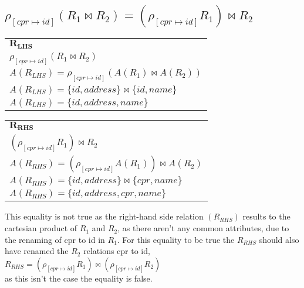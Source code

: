 \subsection{\normalsize{$\rho_{[cpr\mapsto id]}(R_1 \Join R_2) = (\rho_{[cpr\mapsto id]} R_1) \Join R_2$}}

\begin{table}[ht]
	\begin{tabular}{l}
		$\bm{R_{LHS}}$  \\
		$\rho_{[cpr\mapsto id]}(R_1 \Join R_2)$  \\
		$A(R_{LHS}) = \rho_{[cpr\mapsto id]}(A(R_1) \Join A(R_2))$  \\
		$A(R_{LHS}) = \{id, address\} \Join \{id, name\}$  \\
		$A(R_{LHS}) = \{id, address, name\}$
	\end{tabular}
\end{table}

\begin{table}[ht]
	\begin{tabular}{l}
		$\bm{R_{RHS}}$ \\
	 	$(\rho_{[cpr\mapsto id]} R_1) \Join R_2$ \\
		$A(R_{RHS}) = (\rho_{[cpr\mapsto id]}A(R_1)) \Join A(R_2)$ \\
		$A(R_{RHS}) = \{id, address\} \Join \{cpr, name\}$ \\
		$A(R_{RHS}) = \{id, address, cpr, name\}$
	\end{tabular}
\end{table}
\FloatBarrier

This equality is not true as the right-hand side relation $(R_{RHS})$ results to the cartesian product of $R_1$ and $R_2$, as there aren't any common attributes, due to the renaming of cpr to id in $R_1$.
For this equality to be true the $R_{RHS}$ should also have renamed the $R_2$ relations cpr to id,\\
$R_{RHS} = (\rho_{[cpr\mapsto id]} R_1) \Join (\rho_{[cpr\mapsto id]} R_2)$\\
as this isn't the case the equality is false.\\\\
